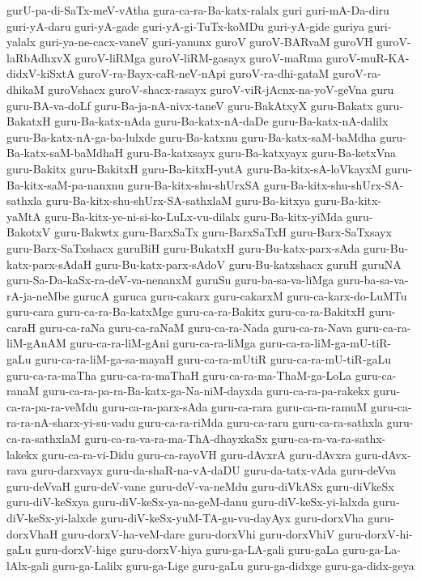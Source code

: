 {gurU-pa-di-SaTx-meV-vAtha
gura-ca-ra-Ba-katx-ralalx
guri
guri-mA-Da-diru
guri-yA-daru
guri-yA-gade
guri-yA-gi-TuTx-koMDu
guri-yA-gide
guriya
guri-yalalx
guri-ya-ne-cacx-vaneV
guri-yanunx
guroV
guroV-BARvaM
guroVH
guroV-laRbAdhxvX
guroV-liRMga
guroV-liRM-gasayx
guroV-maRma
guroV-muR-KA-didxV-kiSxtA
guroV-ra-Bayx-caR-neV-nApi
guroV-ra-dhi-gataM
guroV-ra-dhikaM
guroVshacx
guroV-shacx-rasayx
guroV-viR-jAcnx-na-yoV-geVna
guru
guru-BA-va-doLf
guru-Ba-ja-nA-nivx-taneV
guru-BakAtxyX
guru-Bakatx
guru-BakatxH
guru-Ba-katx-nAda
guru-Ba-katx-nA-daDe
guru-Ba-katx-nA-dalilx
guru-Ba-katx-nA-ga-ba-lulxde
guru-Ba-katxnu
guru-Ba-katx-saM-baMdha
guru-Ba-katx-saM-baMdhaH
guru-Ba-katxsayx
guru-Ba-katxyayx
guru-Ba-ketxVna
guru-Bakitx
guru-BakitxH
guru-Ba-kitxH-yutA
guru-Ba-kitx-sA-loVkayxM
guru-Ba-kitx-saM-pa-nanxnu
guru-Ba-kitx-shu-shUrxSA
guru-Ba-kitx-shu-shUrx-SA-sathxla
guru-Ba-kitx-shu-shUrx-SA-sathxlaM
guru-Ba-kitxya
guru-Ba-kitx-yaMtA
guru-Ba-kitx-ye-ni-si-ko-LuLx-vu-dilalx
guru-Ba-kitx-yiMda
guru-BakotxV
guru-Bakwtx
guru-BarxSaTx
guru-BarxSaTxH
guru-Barx-SaTxsayx
guru-Barx-SaTxshacx
guruBiH
guru-BukatxH
guru-Bu-katx-parx-sAda
guru-Bu-katx-parx-sAdaH
guru-Bu-katx-parx-sAdoV
guru-Bu-katxshacx
guruH
guruNA
guru-Sa-Da-kaSx-ra-deV-va-nenanxM
guruSu
guru-ba-sa-va-liMga
guru-ba-sa-va-rA-ja-neMbe
gurucA
guruca
guru-cakarx
guru-cakarxM
guru-ca-karx-do-LuMTu
guru-cara
guru-ca-ra-Ba-katxMge
guru-ca-ra-Bakitx
guru-ca-ra-BakitxH
guru-caraH
guru-ca-raNa
guru-ca-raNaM
guru-ca-ra-Nada
guru-ca-ra-Nava
guru-ca-ra-liM-gAnAM
guru-ca-ra-liM-gAni
guru-ca-ra-liMga
guru-ca-ra-liM-ga-mU-tiR-gaLu
guru-ca-ra-liM-ga-sa-mayaH
guru-ca-ra-mUtiR
guru-ca-ra-mU-tiR-gaLu
guru-ca-ra-maTha
guru-ca-ra-maThaH
guru-ca-ra-ma-ThaM-ga-LoLa
guru-ca-ranaM
guru-ca-ra-pa-ra-Ba-katx-ga-Na-niM-dayxda
guru-ca-ra-pa-rakekx
guru-ca-ra-pa-ra-veMdu
guru-ca-ra-parx-sAda
guru-ca-rara
guru-ca-ra-ramuM
guru-ca-ra-ra-nA-sharx-yi-su-vadu
guru-ca-ra-riMda
guru-ca-raru
guru-ca-ra-sathxla
guru-ca-ra-sathxlaM
guru-ca-ra-va-ra-ma-ThA-dhayxkaSx
guru-ca-ra-va-ra-sathx-lakekx
guru-ca-ra-vi-Didu
guru-ca-rayoVH
guru-dAvxrA
guru-dAvxra
guru-dAvx-rava
guru-darxvayx
guru-da-shaR-na-vA-daDU
guru-da-tatx-vAda
guru-deVva
guru-deVvaH
guru-deV-vane
guru-deV-va-neMdu
guru-diVkASx
guru-diVkeSx
guru-diV-keSxya
guru-diV-keSx-ya-na-geM-danu
guru-diV-keSx-yi-lalxda
guru-diV-keSx-yi-lalxde
guru-diV-keSx-yuM-TA-gu-vu-dayAyx
guru-dorxVha
guru-dorxVhaH
guru-dorxV-ha-veM-dare
guru-dorxVhi
guru-dorxVhiV
guru-dorxV-hi-gaLu
guru-dorxV-hige
guru-dorxV-hiya
guru-ga-LA-gali
guru-gaLa
guru-ga-La-lAlx-gali
guru-ga-Lalilx
guru-ga-Lige
guru-gaLu
guru-ga-didxge
guru-ga-didx-geya
}
